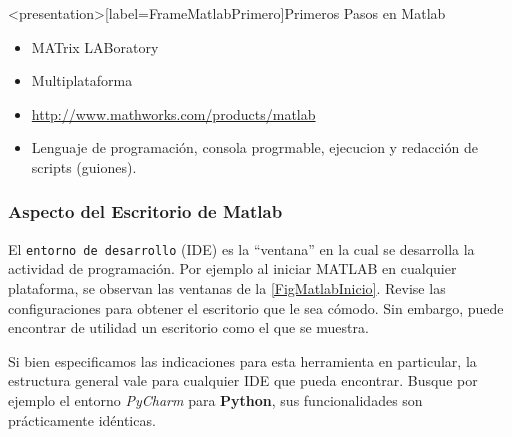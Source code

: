 \mode*

\begin{frame}<presentation>[label=FrameMatlabPrimero]{Primeros Pasos en Matlab}
\begin{itemize}
\item[\minilogo] MATrix LABoratory
\item[\minilogo] Multiplataforma
\item[\minilogo] \url{http://www.mathworks.com/products/matlab}
\item[\minilogo] Lenguaje de programación, consola progrmable, ejecucion y redacción de scripts (guiones).
\end{itemize}
\end{frame}


\begin{frame}[label=FrameVentanaMatlab]
\frametitle<presentation>{Aspecto del Escritorio de Matlab}
\begin{figure}
\begin{center}
\end{center}
\end{figure}
 
\end{frame}

{
  El \texttt{entorno de desarrollo} (IDE) es la ``ventana''  en la cual se desarrolla la actividad de programación.
 Por ejemplo al iniciar MATLAB en cualquier plataforma, se observan las ventanas de la 
 \autoref{FigMatlabInicio}. Revise las configuraciones para obtener
el escritorio que le sea cómodo. Sin embargo, puede encontrar de 
 utilidad un escritorio como el que se muestra. 

 Si bien especificamos las indicaciones para esta herramienta 
 en particular, la estructura general vale para cualquier IDE que pueda encontrar.
 Busque por ejemplo el entorno \emph{PyCharm} para  \textbf{Python}, sus funcionalidades son   prácticamente idénticas.
}


